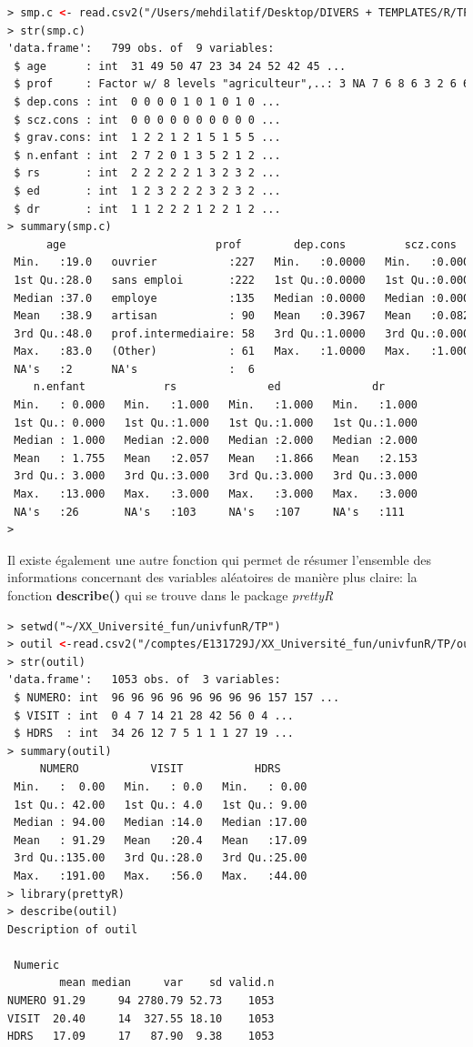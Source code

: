 \begin{lstlisting}[language=html]
> smp.c <- read.csv2("/Users/mehdilatif/Desktop/DIVERS + TEMPLATES/R/TP/outils_hdrs.csv")
> str(smp.c)
'data.frame':	799 obs. of  9 variables:
 $ age      : int  31 49 50 47 23 34 24 52 42 45 ...
 $ prof     : Factor w/ 8 levels "agriculteur",..: 3 NA 7 6 8 6 3 2 6 6 ...
 $ dep.cons : int  0 0 0 0 1 0 1 0 1 0 ...
 $ scz.cons : int  0 0 0 0 0 0 0 0 0 0 ...
 $ grav.cons: int  1 2 2 1 2 1 5 1 5 5 ...
 $ n.enfant : int  2 7 2 0 1 3 5 2 1 2 ...
 $ rs       : int  2 2 2 2 2 1 3 2 3 2 ...
 $ ed       : int  1 2 3 2 2 2 3 2 3 2 ...
 $ dr       : int  1 1 2 2 2 1 2 2 1 2 ...
> summary(smp.c)
      age                       prof        dep.cons         scz.cons        grav.cons    
 Min.   :19.0   ouvrier           :227   Min.   :0.0000   Min.   :0.0000   Min.   :1.000  
 1st Qu.:28.0   sans emploi       :222   1st Qu.:0.0000   1st Qu.:0.0000   1st Qu.:2.000  
 Median :37.0   employe           :135   Median :0.0000   Median :0.0000   Median :4.000  
 Mean   :38.9   artisan           : 90   Mean   :0.3967   Mean   :0.0826   Mean   :3.643  
 3rd Qu.:48.0   prof.intermediaire: 58   3rd Qu.:1.0000   3rd Qu.:0.0000   3rd Qu.:5.000  
 Max.   :83.0   (Other)           : 61   Max.   :1.0000   Max.   :1.0000   Max.   :7.000  
 NA's   :2      NA's              :  6                                     NA's   :4      
    n.enfant            rs              ed              dr       
 Min.   : 0.000   Min.   :1.000   Min.   :1.000   Min.   :1.000  
 1st Qu.: 0.000   1st Qu.:1.000   1st Qu.:1.000   1st Qu.:1.000  
 Median : 1.000   Median :2.000   Median :2.000   Median :2.000  
 Mean   : 1.755   Mean   :2.057   Mean   :1.866   Mean   :2.153  
 3rd Qu.: 3.000   3rd Qu.:3.000   3rd Qu.:3.000   3rd Qu.:3.000  
 Max.   :13.000   Max.   :3.000   Max.   :3.000   Max.   :3.000  
 NA's   :26       NA's   :103     NA's   :107     NA's   :111    
> 
\end{lstlisting}
Il existe également une autre fonction qui permet de résumer l'ensemble des informations concernant des variables aléatoires de manière plus claire: la fonction \textbf{describe()} qui se trouve dans le package \textit{prettyR}
\begin{lstlisting}[language=html]
> setwd("~/XX_Université_fun/univfunR/TP")
> outil <-read.csv2("/comptes/E131729J/XX_Université_fun/univfunR/TP/outils_hdrs.csv")
> str(outil)
'data.frame':	1053 obs. of  3 variables:
 $ NUMERO: int  96 96 96 96 96 96 96 96 157 157 ...
 $ VISIT : int  0 4 7 14 21 28 42 56 0 4 ...
 $ HDRS  : int  34 26 12 7 5 1 1 1 27 19 ...
> summary(outil)
     NUMERO           VISIT           HDRS      
 Min.   :  0.00   Min.   : 0.0   Min.   : 0.00  
 1st Qu.: 42.00   1st Qu.: 4.0   1st Qu.: 9.00  
 Median : 94.00   Median :14.0   Median :17.00  
 Mean   : 91.29   Mean   :20.4   Mean   :17.09  
 3rd Qu.:135.00   3rd Qu.:28.0   3rd Qu.:25.00  
 Max.   :191.00   Max.   :56.0   Max.   :44.00  
> library(prettyR)
> describe(outil)
Description of outil 

 Numeric 
        mean median     var    sd valid.n
NUMERO 91.29     94 2780.79 52.73    1053
VISIT  20.40     14  327.55 18.10    1053
HDRS   17.09     17   87.90  9.38    1053
\end{lstlisting}
